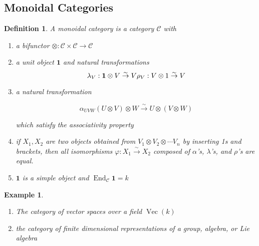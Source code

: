 \documentclass[]{article}
\newtheorem{defn}[theorem]{Definition}
\newtheorem{example}[theorem]{Example}
\newcommand{\isomto}{\overset{\sim}{\rightarrow}}
\newcommand{\End}{\operatorname{End}}
\numberwithin{equation}{subsection}
\begin{document}
\subsection{Monoidal Categories}
\begin{defn}
    A \emph{monoidal category} is a category $\mathcal{C}$ with 
    \begin{enumerate}
    \renewcommand{\labelenumi}{\roman{enumi})}
        \item a bifunctor $\otimes: \mathcal{C} \times \mathcal{C} \to
            \mathcal{C}$
        \item a unit object $\mathbf{1}$ and natural transformations
            \begin{equation}
                \lambda_V : \mathbf{1} \otimes V \isomto V \\
                \rho_V : V \otimes 1 \isomto V
            \end{equation}
        \item a natural transformation 

            \begin{equation}
                \alpha_{UVW} (U \otimes V) \otimes W \isomto U \otimes (V \otimes W)
            \end{equation}

            which satisfy the associativity property 

        \item if $X_1, X_2$ are two objects obtained from $V_1 \otimes V_2 \otimes \cdots V_n$ by inserting 1s and brackets, then all isomorphisms $\varphi: X_1 \isomto X_2$ composed of $\alpha$'s, $\lambda$'s, and $\rho$'s are equal. 
        \item $\mathbf{1}$ is a simple object and $\End_\mathcal{C} \mathbf{1} = k$
    \end{enumerate}

\end{defn}

\begin{example}
    \begin{enumerate}
    \renewcommand{\labelenumi}{\roman{enumi})}
        \item The category of vector spaces over a field $\operatorname{Vec}(k)$
        \item the category of finite dimensional representations of a group, algebra, or Lie algebra
    \end{enumerate}
\end{example}
    
\end{document}
